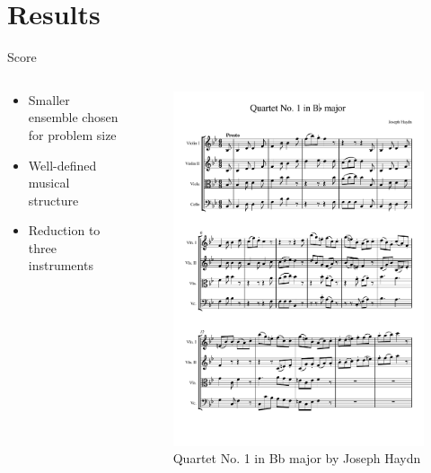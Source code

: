\documentclass[handout]{beamer}
\begin{document}
\section{Results} %

\begin{frame}{Score}

    \begin{columns}
        \begin{column}{.6\textwidth}
            \begin{itemize}
                \item Smaller ensemble chosen for problem size
                \item Well-defined musical structure
                \item Reduction to three instruments
            \end{itemize}
        \end{column}
        \begin{column}{.4\textwidth}
            \begin{figure}
                \includegraphics[width=\textwidth, page=1]{haydn.pdf}
                \caption{Quartet No. 1 in Bb major by Joseph Haydn}
            \end{figure}
        \end{column}
    \end{columns}
    

\end{frame}
\end{document}

